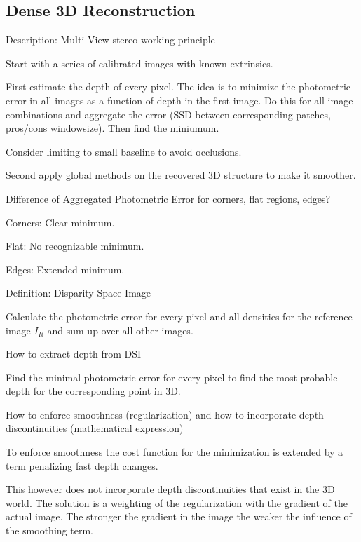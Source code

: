 \documentclass[10pt,a4paper]{scrartcl}
\begin{document}
\begin{multicols*}{2}
\subsection*{Dense 3D Reconstruction}

\begin{QandA}
{Description: Multi-View stereo working principle}
\item Start with a series of calibrated images with known extrinsics.
\item First estimate the depth of every pixel. The idea is to minimize the photometric error in all images as a function of depth in the first image. Do this for all image combinations and aggregate the error (SSD between corresponding patches, pros/cons windowsize). Then find the miniumum.
\item Consider limiting to small baseline to avoid occlusions.
\item Second apply global methods on the recovered 3D structure to make it smoother.
\end{QandA}

\begin{QandA}
{Difference of Aggregated Photometric Error for corners, flat regions, edges?}
\item Corners: Clear minimum.
\item Flat: No recognizable minimum.
\item Edges: Extended minimum.
\end{QandA}

\begin{QandA}
{Definition: Disparity Space Image}
\item Calculate the photometric error for every pixel and all densities for the reference image $I_R$ and sum up over all other images.
\end{QandA}

\begin{QandA}
{How to extract depth from DSI}
\item Find the minimal photometric error for every pixel to find the most probable depth for the corresponding point in 3D.
\end{QandA}

\begin{QandA}
{How to enforce smoothness (regularization) and how to incorporate depth discontinuities (mathematical expression)}
\item To enforce smoothness the cost function for the minimization is extended by a term penalizing fast depth changes.
\item This however does not incorporate depth discontinuities that exist in the 3D world. The solution is a weighting of the regularization with the gradient of the actual image. The stronger the gradient in the image the weaker the influence of the smoothing term.
\end{QandA}


\end{multicols*}
\end{document}
